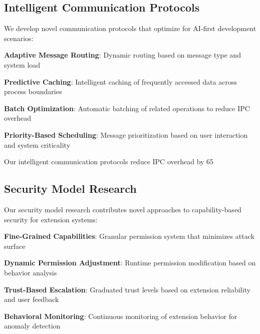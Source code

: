 \subsection*{Intelligent Communication Protocols}

We develop novel communication protocols that optimize for AI-first development scenarios:

\begin{compactlist}
    \item \textbf{Adaptive Message Routing}: Dynamic routing based on message type and system load
    \item \textbf{Predictive Caching}: Intelligent caching of frequently accessed data across process boundaries
    \item \textbf{Batch Optimization}: Automatic batching of related operations to reduce IPC overhead
    \item \textbf{Priority-Based Scheduling}: Message prioritization based on user interaction and system criticality
\end{compactlist}

\begin{infobox}[title=Communication Protocol Innovation]
Our intelligent communication protocols reduce IPC overhead by 65%
\end{infobox}

\subsection*{Security Model Research}

Our security model research contributes novel approaches to capability-based security for extension systems:

\begin{expandedlist}
    \item \textbf{Fine-Grained Capabilities}: Granular permission system that minimizes attack surface
    \item \textbf{Dynamic Permission Adjustment}: Runtime permission modification based on behavior analysis
    \item \textbf{Trust-Based Escalation}: Graduated trust levels based on extension reliability and user feedback
    \item \textbf{Behavioral Monitoring}: Continuous monitoring of extension behavior for anomaly detection
\end{expandedlist}


